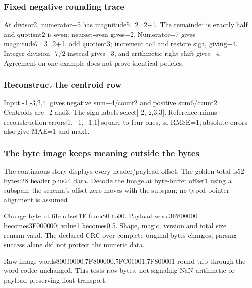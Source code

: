 \subsubsection{Fixed negative rounding trace}\label{appendix-92ff77d4dfdc-fixed-negative-rounding-trace}

\hypertarget{appendix-92ff77d4dfdc-fixed-negative-rounding-trace}{}

At divisor2, numerator−5 has magnitude5=2·2+1. The remainder is exactly half and quotient2 is even; nearest-even gives−2. Numerator−7 gives magnitude7=3·2+1, odd quotient3; increment to4 and restore sign, giving−4. Integer division−7/2 instead gives−3, and arithmetic right shift gives−4. Agreement on one example does not prove identical policies.

\subsubsection{Reconstruct the centroid row}\label{appendix-92ff77d4dfdc-reconstruct-the-centroid-row}

\hypertarget{appendix-92ff77d4dfdc-reconstruct-the-centroid-row}{}

Input{[}-1,-3,2,4{]} gives negative sum−4/count2 and positive sum6/count2. Centroids are−2 and3. The sign labels select{[}-2,-2,3,3{]}. Reference-minus-reconstruction errors{[}1,−1,−1,1{]} square to four ones, so RMSE=1; absolute errors also give MAE=1 and max1.

\subsubsection{The byte image keeps meaning outside the bytes}\label{appendix-92ff77d4dfdc-the-byte-image-keeps-meaning-outside-the-bytes}

\hypertarget{appendix-92ff77d4dfdc-the-byte-image-keeps-meaning-outside-the-bytes}{}

The continuous story displays every header/payload offset. The golden total is52 bytes:28 header plus24 data. Decode the image at byte-buffer offset1 using a subspan: the schema's offset zero moves with the subspan; no typed pointer alignment is assumed.

Change byte at file offset1E from80 to00. Payload word3F800000 becomes3F000000; value1 becomes0.5. Shape, magic, version and total size remain valid. The declared CRC over complete original bytes changes; parsing success alone did not protect the numeric data.

Raw image words80000000,7F800000,7FC00001,7F800001 round-trip through the word codec unchanged. This tests raw bytes, not signaling-NaN arithmetic or payload-preserving float transport.

